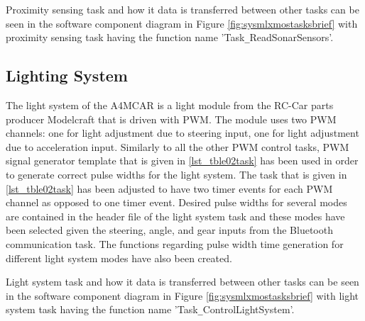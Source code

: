 Proximity sensing task and how it data is transferred between other tasks can be seen in the software component diagram in Figure \ref{fig:sysmlxmostasksbrief} with proximity sensing task having the function name 'Task\texttt{\_}ReadSonarSensors'.

\newpage

\subsection{Lighting System}
The light system of the A4MCAR is a light module from the RC-Car parts producer Modelcraft that is driven with PWM. The module uses two PWM channels: one for light adjustment due to steering input, one for light adjustment due to acceleration input. Similarly to all the other PWM control tasks, PWM signal generator template that is given in \ref{lst_tble02task} has been used in order to generate correct pulse widths for the light system. The task that is given in \ref{lst_tble02task} has been adjusted to have two timer events for each PWM channel as opposed to one timer event. Desired pulse widths for several modes are contained in the header file of the light system task and these modes have been selected given the steering, angle, and gear inputs from the Bluetooth communication task. The functions regarding pulse width time generation for different light system modes have also been created. 

Light system task and how it data is transferred between other tasks can be seen in the software component diagram in Figure \ref{fig:sysmlxmostasksbrief} with light system task having the function name 'Task\texttt{\_}ControlLightSystem'.

